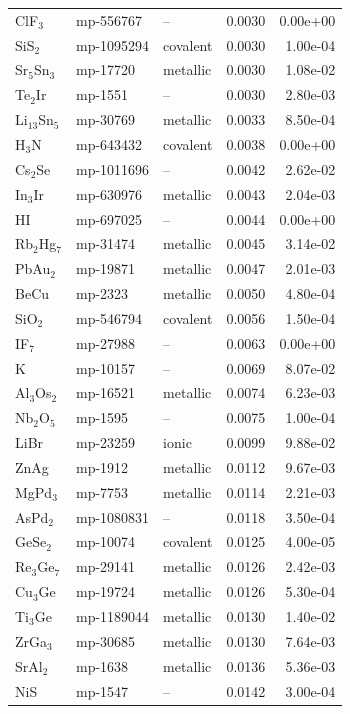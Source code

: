 \begin{longtable}{@{}l l l r r@{}}
ClF$_{3}$ & mp-556767 & -- & 0.0030 & 0.00e+00 \\
SiS$_{2}$ & mp-1095294 & covalent & 0.0030 & 1.00e-04 \\
Sr$_{5}$Sn$_{3}$ & mp-17720 & metallic & 0.0030 & 1.08e-02 \\
Te$_{2}$Ir & mp-1551 & -- & 0.0030 & 2.80e-03 \\
Li$_{13}$Sn$_{5}$ & mp-30769 & metallic & 0.0033 & 8.50e-04 \\
H$_{3}$N & mp-643432 & covalent & 0.0038 & 0.00e+00 \\
Cs$_{2}$Se & mp-1011696 & -- & 0.0042 & 2.62e-02 \\
In$_{3}$Ir & mp-630976 & metallic & 0.0043 & 2.04e-03 \\
HI & mp-697025 & -- & 0.0044 & 0.00e+00 \\
Rb$_{2}$Hg$_{7}$ & mp-31474 & metallic & 0.0045 & 3.14e-02 \\
PbAu$_{2}$ & mp-19871 & metallic & 0.0047 & 2.01e-03 \\
BeCu & mp-2323 & metallic & 0.0050 & 4.80e-04 \\
SiO$_{2}$ & mp-546794 & covalent & 0.0056 & 1.50e-04 \\
IF$_{7}$ & mp-27988 & -- & 0.0063 & 0.00e+00 \\
K & mp-10157 & -- & 0.0069 & 8.07e-02 \\
Al$_{3}$Os$_{2}$ & mp-16521 & metallic & 0.0074 & 6.23e-03 \\
Nb$_{2}$O$_{5}$ & mp-1595 & -- & 0.0075 & 1.00e-04 \\
LiBr & mp-23259 & ionic & 0.0099 & 9.88e-02 \\
ZnAg & mp-1912 & metallic & 0.0112 & 9.67e-03 \\
MgPd$_{3}$ & mp-7753 & metallic & 0.0114 & 2.21e-03 \\
AsPd$_{2}$ & mp-1080831 & -- & 0.0118 & 3.50e-04 \\
GeSe$_{2}$ & mp-10074 & covalent & 0.0125 & 4.00e-05 \\
Re$_{3}$Ge$_{7}$ & mp-29141 & metallic & 0.0126 & 2.42e-03 \\
Cu$_{3}$Ge & mp-19724 & metallic & 0.0126 & 5.30e-04 \\
Ti$_{3}$Ge & mp-1189044 & metallic & 0.0130 & 1.40e-02 \\
ZrGa$_{3}$ & mp-30685 & metallic & 0.0130 & 7.64e-03 \\
SrAl$_{2}$ & mp-1638 & metallic & 0.0136 & 5.36e-03 \\
NiS & mp-1547 & -- & 0.0142 & 3.00e-04 \\

\end{longtable}
